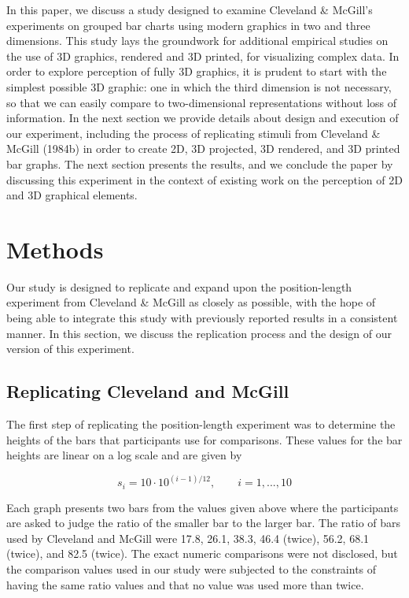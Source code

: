 \documentclass[phd]{nuthesis}
\begin{document}
In this paper, we discuss a study designed to examine Cleveland \&
McGill's experiments on grouped bar charts using modern graphics in two
and three dimensions. This study lays the groundwork for additional
empirical studies on the use of 3D graphics, rendered and 3D printed,
for visualizing complex data. In order to explore perception of fully 3D
graphics, it is prudent to start with the simplest possible 3D graphic:
one in which the third dimension is not necessary, so that we can easily
compare to two-dimensional representations without loss of information.
In the next section we provide details about design and execution of our
experiment, including the process of replicating stimuli from Cleveland
\& McGill (1984b) in order to create 2D, 3D projected, 3D rendered, and
3D printed bar graphs. The next section presents the results, and we
conclude the paper by discussing this experiment in the context of
existing work on the perception of 2D and 3D graphical elements.

\section{Methods}\label{methods}

Our study is designed to replicate and expand upon the position-length
experiment from Cleveland \& McGill as closely as possible, with the
hope of being able to integrate this study with previously reported
results in a consistent manner. In this section, we discuss the
replication process and the design of our version of this experiment.

\subsection{Replicating Cleveland and
McGill}\label{replicating-cleveland-and-mcgill}

The first step of replicating the position-length experiment was to
determine the heights of the bars that participants use for comparisons.
These values for the bar heights are linear on a log scale and are given
by

\[
s_i=10\cdot 10^{(i-1)/12}, \qquad i=1,...,10
\]

Each graph presents two bars from the values given above where the
participants are asked to judge the ratio of the smaller bar to the
larger bar. The ratio of bars used by Cleveland and McGill were 17.8,
26.1, 38.3, 46.4 (twice), 56.2, 68.1 (twice), and 82.5 (twice). The
exact numeric comparisons were not disclosed, but the comparison values
used in our study were subjected to the constraints of having the same
ratio values and that no value was used more than twice.
\end{document}
